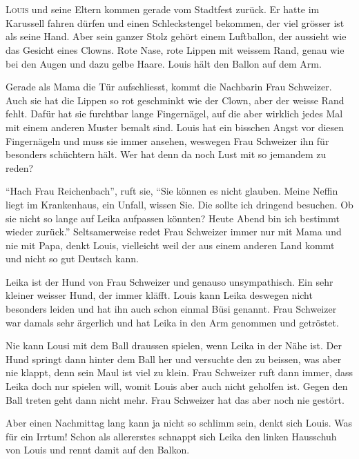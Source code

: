 \chapter*{}
\lettrine[lines=3]{\color{DeepPink}L}{ouis} und seine Eltern kommen gerade vom Stadtfest zurück. Er hatte im Karussell fahren dürfen und einen Schleckstengel bekommen, der viel grösser ist als seine Hand. Aber sein ganzer Stolz gehört einem Luftballon, der aussieht wie das Gesicht eines Clowns. Rote Nase, rote Lippen mit weissem Rand, genau wie bei den Augen und dazu gelbe Haare. Louis hält den Ballon auf dem Arm.

Gerade als Mama die Tür aufschliesst, kommt die Nachbarin Frau Schweizer. Auch sie hat die Lippen so rot geschminkt wie der Clown, aber der weisse Rand fehlt. Dafür hat sie furchtbar lange Fingernägel, auf die aber wirklich jedes Mal mit einem anderen Muster bemalt sind. Louis hat ein bisschen Angst vor diesen Fingernägeln und muss sie immer ansehen, weswegen Frau Schweizer ihn für besonders schüchtern hält. Wer hat denn da noch Lust mit so jemandem zu reden?

\enquote{Hach Frau Reichenbach}, ruft sie, \enquote{Sie können es nicht glauben. Meine Neffin liegt im Krankenhaus, ein Unfall, wissen Sie. Die sollte ich dringend besuchen. Ob sie nicht so lange auf Leika aufpassen könnten? Heute Abend bin ich bestimmt wieder zurück.} Seltsamerweise redet Frau Schweizer immer nur mit Mama und nie mit Papa, denkt Louis, vielleicht weil der aus einem anderen Land kommt und nicht so gut Deutsch kann.

Leika ist der Hund von Frau Schweizer und genauso unsympathisch. Ein sehr kleiner weisser Hund, der immer kläfft. Louis kann Leika deswegen nicht besonders leiden und hat ihn auch schon einmal Büsi genannt. Frau Schweizer war damals sehr ärgerlich und hat Leika in den Arm genommen und getröstet. 

Nie kann Lousi mit dem Ball draussen spielen, wenn Leika in der Nähe ist. Der Hund springt dann hinter dem Ball her und versuchte den zu beissen, was aber nie klappt, denn sein Maul ist viel zu klein. Frau Schweizer ruft dann immer, dass Leika doch nur spielen will, womit Louis aber auch nicht geholfen ist. Gegen den Ball treten geht dann nicht mehr. Frau Schweizer hat das aber noch nie gestört.

Aber einen Nachmittag lang kann ja nicht so schlimm sein, denkt sich Louis. Was für ein Irrtum! Schon als allererstes schnappt sich Leika den linken Hausschuh von Louis und rennt damit auf den Balkon.

